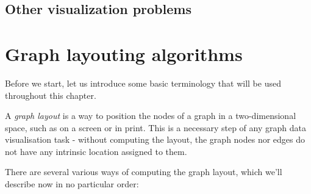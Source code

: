 \subsection{Other visualization problems}

\section{Graph layouting algorithms}

Before we start, let us introduce some basic terminology that will be used throughout this chapter.

A \emph{graph layout} is a way to position the nodes of a graph in a two-dimensional space, such as on a screen or in print. 
This is a necessary step of any graph data visualisation task - without computing the layout, the graph nodes nor edges do not have any intrinsic location assigned to them.

There are several various ways of computing the graph layout, which we'll describe now in no particular order:

